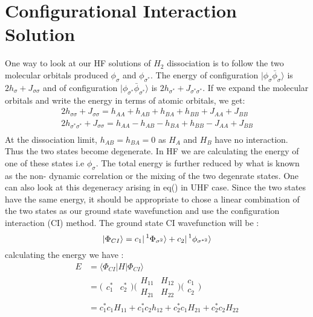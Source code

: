 \documentclass[11pt]{article}   	%
\begin{document}
\section{Configurational Interaction Solution}
	One way to look at our HF solutions of $H_2$ dissociation is to follow the two molecular orbitals produced $\phi_{\sigma}$ and $\phi_{\sigma^*}$. 
	The energy of configuration $|\phi_{\sigma} \bar{\phi}_{\sigma}\rangle$ is $2h_{\sigma} +J_{\sigma \sigma}$ and of configuration 
	$|\phi_{\sigma^*} \bar{\phi}_{\sigma^*}\rangle$ is $2h_{\sigma^*} +J_{\sigma^* \sigma^*}$. If we expand the molecular orbitals and 
	write the energy in terms of atomic orbitals, we get:\\
	\begin{equation}
	\begin{split}
	2h_{\sigma \sigma} +J_{\sigma \sigma}=h_{AA}+h_{AB}+h_{BA}+h_{BB}+J_{AA}+J_{BB}\\
	2h_{\sigma^* \sigma^*} +J_{\sigma \sigma}=h_{AA}-h_{AB}-h_{BA}+h_{BB}-J_{AA}+J_{BB}\\
	\end{split}
	\end{equation}
	At the dissociation limit, $h_{AB}=h_{BA}=0$ as $H_A$ and $H_B$ have no interaction. 
	Thus the two states become degenerate. In HF we are calculating the energy of one of these 
	states i.e $\phi_{\sigma}$. The total energy is further reduced by what is known as the non-
	dynamic correlation or the mixing of the two degenrate states. 
	One can also look at this degeneracy arising in eq() in UHF case. 
	Since the two states have the same energy, it should be appropriate to chose a linear 
	combination of the two states as our ground state wavefunction and use the configuration 
	interaction (CI) method. The ground state CI wavefunction will be :\\
	\begin{equation}
		|\Phi_{CI}\rangle=c_1|\prescript{1}{}{\Phi_{\sigma^2}}\rangle+c_2|\prescript{1}{}{\phi_{\sigma^{*2}}}\rangle
	\end{equation}
	calculating the energy we have :\\
	\begin{equation}
	\begin{split}
		E&=\langle\Phi_{CI}|H|\Phi_{CI}\rangle\\
		 &=\big( \begin{matrix} c_1^* & c_2^* \end{matrix} \big)\bigg(\begin{matrix} H_{11} & H_{12} \\ H_{21} & H_{22} \end{matrix}\bigg)
			 \bigg( \begin{matrix} c_1\\c_2\end{matrix}\bigg)\\
		 &=c_1^*c_1H_{11}+c_1^*c_2h_{12}+c_2^*c_1H_{21}+c_2^*c_2H_{22}\\
	\end{split}
	\end{equation}
\end{document}
